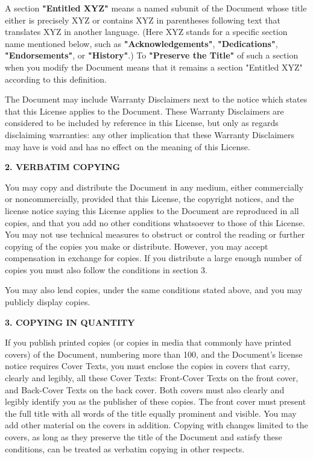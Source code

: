 \documentclass[a4paper,11pt]{article}
\begin{document}
A section \textbf{"Entitled XYZ"} means a named subunit of the Document whose
title either is precisely XYZ or contains XYZ in parentheses following
text that translates XYZ in another language.  (Here XYZ stands for a
specific section name mentioned below, such as \textbf{"Acknowledgements"},
\textbf{"Dedications"}, \textbf{"Endorsements"}, or \textbf{"History"}.)  
To \textbf{"Preserve the Title"}
of such a section when you modify the Document means that it remains a
section "Entitled XYZ" according to this definition.

The Document may include Warranty Disclaimers next to the notice which
states that this License applies to the Document.  These Warranty
Disclaimers are considered to be included by reference in this
License, but only as regards disclaiming warranties: any other
implication that these Warranty Disclaimers may have is void and has
no effect on the meaning of this License.


\begin{center}
{\Large\bf 2. VERBATIM COPYING}
\end{center}

You may copy and distribute the Document in any medium, either
commercially or noncommercially, provided that this License, the
copyright notices, and the license notice saying this License applies
to the Document are reproduced in all copies, and that you add no other
conditions whatsoever to those of this License.  You may not use
technical measures to obstruct or control the reading or further
copying of the copies you make or distribute.  However, you may accept
compensation in exchange for copies.  If you distribute a large enough
number of copies you must also follow the conditions in section 3.

You may also lend copies, under the same conditions stated above, and
you may publicly display copies.


\begin{center}
{\Large\bf 3. COPYING IN QUANTITY}
\end{center}


If you publish printed copies (or copies in media that commonly have
printed covers) of the Document, numbering more than 100, and the
Document's license notice requires Cover Texts, you must enclose the
copies in covers that carry, clearly and legibly, all these Cover
Texts: Front-Cover Texts on the front cover, and Back-Cover Texts on
the back cover.  Both covers must also clearly and legibly identify
you as the publisher of these copies.  The front cover must present
the full title with all words of the title equally prominent and
visible.  You may add other material on the covers in addition.
Copying with changes limited to the covers, as long as they preserve
the title of the Document and satisfy these conditions, can be treated
as verbatim copying in other respects.
\end{document}
